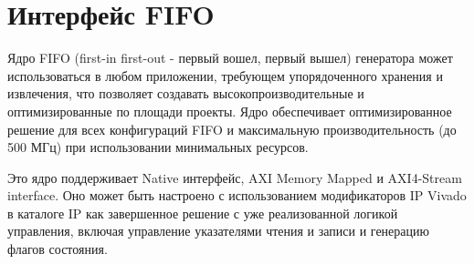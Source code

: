 

\section{Интерфейс FIFO}

Ядро FIFO (first-in first-out - первый вошел, первый вышел) генератора может использоваться в любом приложении, требующем упорядоченного
хранения и извлечения, что позволяет создавать высокопроизводительные и оптимизированные по площади проекты.
Ядро обеспечивает оптимизированное решение для всех конфигураций FIFO и  максимальную производительность (до 500 МГц) при использовании
минимальных ресурсов.

Это ядро поддерживает Native интерфейс, AXI Memory Mapped и AXI4-Stream interface.
Оно может быть настроено с использованием модификаторов IP Vivado в каталоге
IP как завершенное решение с уже реализованной логикой управления, включая управление указателями
чтения и записи и генерацию флагов состояния.

